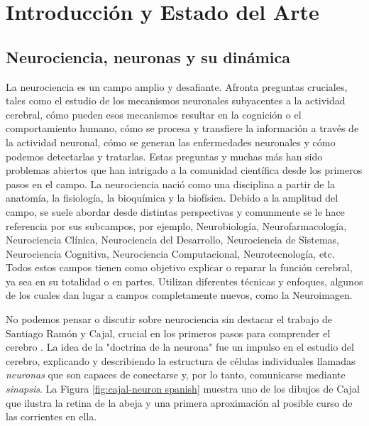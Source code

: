 \chapter{Introducción y Estado del Arte}
\label{c-intro spanish}

\section{Neurociencia, neuronas y su dinámica}
La neurociencia es un campo amplio y desafiante. Afronta preguntas cruciales, tales como el estudio de los mecanismos neuronales subyacentes a la actividad cerebral, cómo pueden esos mecanismos resultar en la cognición o el comportamiento humano, cómo se procesa y transfiere la información a través de la actividad neuronal, cómo se generan las enfermedades neuronales y cómo podemos detectarlas y tratarlas. 
Estas preguntas y muchas más han sido problemas abiertos que han intrigado a la comunidad científica desde los primeros pasos en el campo. La neurociencia nació como una disciplina a partir de la anatomía, la fisiología, la bioquímica y la biofísica. Debido a la amplitud del campo, se suele abordar desde distintas perspectivas y comunmente se le hace referencia por sus subcampos, por ejemplo, Neurobiología, Neurofarmacología, Neurociencia Clínica, Neurociencia del Desarrollo, Neurociencia de Sistemas, Neurociencia Cognitiva, Neurociencia Computacional, Neurotecnología, etc. Todos estos campos tienen como objetivo explicar o reparar la función cerebral, ya sea en su totalidad o en partes. Utilizan diferentes técnicas y enfoques, algunos de los cuales dan lugar a campos completamente nuevos, como la Neuroimagen.

No podemos pensar o discutir sobre neurociencia sin destacar el trabajo de Santiago Ramón y Cajal, crucial en los primeros pasos para comprender el cerebro \parencite{ramonycajal_textura_1899,decarlos_historical_2007,decastro_editorial_2016,delgado-garcia_cajal_2015,decastro_cajal_2019}. La idea de la "doctrina de la neurona" fue un impulso en el estudio del cerebro, explicando y describiendo la estructura de células individuales llamadas \textit{neuronas} que son capaces de conectarse y, por lo tanto, comunicarse mediante \textit{sinapsis}. La Figura \ref{fig:cajal-neuron spanish} muestra uno de los dibujos de Cajal que ilustra la retina de la abeja y una primera aproximación al posible curso de las corrientes en ella.

